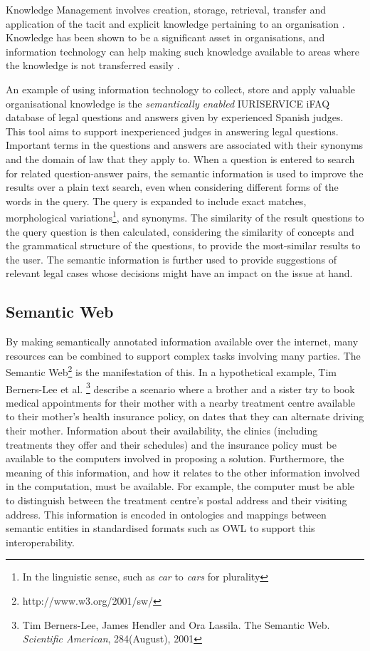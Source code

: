 \documentclass[a4paper]{report}
\begin{document}
Knowledge Management involves creation, storage, retrieval, transfer and application of the tacit and explicit knowledge pertaining to an organisation \citep{AlaviLeidner2001KM}.
Knowledge has been shown to be a significant asset in organisations, and information technology can help making such knowledge available to areas where the knowledge is not transferred easily \citep{AlaviLeidner2001KM}.

An example of using information technology to collect, store and apply valuable organisational knowledge is the \emph{semantically enabled} IURISERVICE iFAQ database of legal questions and answers given by experienced Spanish judges.
This tool aims to support inexperienced judges in answering legal questions\cite{IURISERVICEPerformance2007}.
Important terms in the questions and answers are associated with their synonyms and the domain of law that they apply to.
When a question is entered to search for related question-answer pairs, the semantic information is used to improve the results over a plain text search, even when considering different forms of the words in the query.
The query is expanded to include exact matches, morphological variations\footnote{In the linguistic sense, such as \emph{car} to \emph{cars} for plurality}, and synonyms.
The similarity of the result questions to the query question is then calculated, considering the similarity of concepts and the grammatical structure of the questions, to provide the most-similar results to the user.
The semantic information is further used to provide suggestions of relevant legal cases whose decisions might have an impact on the issue at hand.

\subsection{Semantic Web}

By making semantically annotated information available over the internet, many resources can be combined to support complex tasks involving many parties.
The Semantic Web\footnote{http://www.w3.org/2001/sw/} is the manifestation of this.
In a hypothetical example, Tim Berners-Lee et al. \footnote{Tim Berners-Lee, James Hendler and Ora Lassila. The Semantic Web. \emph{Scientific American}, 284(August), 2001} describe a scenario where a brother and a sister try to book medical appointments for their mother with a nearby treatment centre available to their mother's health insurance policy, on dates that they can alternate driving their mother.
Information about their availability, the clinics (including treatments they offer and their schedules) and the insurance policy must be available to the computers involved in proposing a solution.
Furthermore, the meaning of this information, and how it relates to the other information involved in the computation, must be available.
For example, the computer must be able to distinguish between the treatment centre's postal address and their visiting address.
This information is encoded in ontologies and mappings between semantic entities in standardised formats such as OWL\cite{OWLOverview2004} to support this interoperability.
\end{document}
